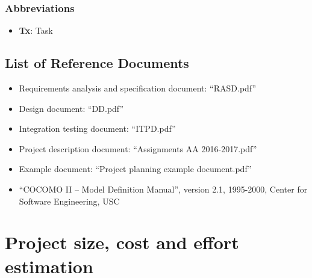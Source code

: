 \documentclass[english]{article}
\begin{document}
\subsubsection{Abbreviations}
\begin{itemize}
	\item{\textbf{Tx}: Task}
\end{itemize}

\subsection{List of Reference Documents}

\begin{itemize}
	\item{Requirements analysis and specification document: “RASD.pdf”}
	\item{Design document: “DD.pdf”}
	\item{Integration testing document: “ITPD.pdf”}
	\item{Project description document: “Assignments AA 2016-2017.pdf”}
	\item{Example document: “Project planning example document.pdf”}
	\item{“COCOMO II -- Model Definition Manual”, version 2.1, 1995-2000, Center for Software Engineering, USC} %
\end{itemize}

\section{Project size, cost and effort estimation}

\end{document}
